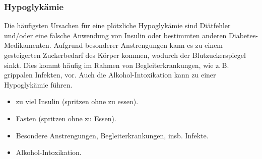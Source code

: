\subsubsection{Hypoglykämie}
\label{topic:hypoglykaemie}


{
Die häufigsten Ursachen für eine plötzliche Hypoglykämie sind Diätfehler
und/oder eine falsche Anwendung von Insulin oder bestimmten anderen
Diabetes-Medikamenten. Aufgrund besonderer Anstrengungen kann es zu einem
gesteigerten Zuckerbedarf des Körper kommen, wodurch der Blutzuckerspiegel
sinkt. Dies kommt häufig im Rahmen von Begleiterkrankungen, wie z.\,B. grippalen
Infekten, vor. Auch die Alkohol-Intoxikation kann zu einer
Hypoglykämie führen\cite{LoefflerBiochemie7}. 
}{
\begin{itemize}
  \item zu viel Insulin (spritzen ohne zu essen).
  \item Fasten (spritzen ohne zu Essen).
  \item Besondere Anstrengungen, Begleiterkrankungen,
  insb. Infekte.
  \item Alkohol-Intoxikation.
\end{itemize}
}{}{}{}






